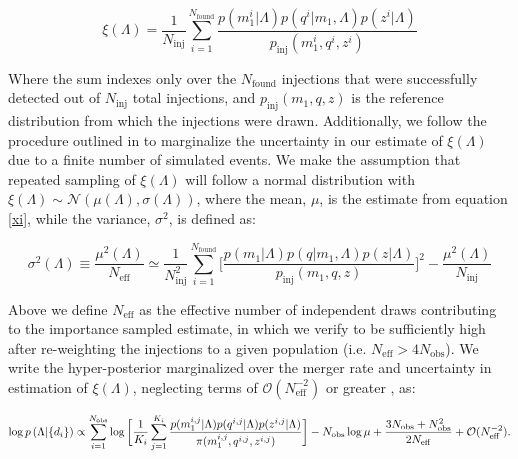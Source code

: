 \documentclass[twocolumn, linenumber]{aastex63}
\begin{document}
\begin{equation} \label{xi}
     \xi(\Lambda) = \frac{1}{N_\mathrm{inj}} \sum_{i=1}^{N_\mathrm{found}} \frac{p(m_1^i | \Lambda) p(q^i | m_1, \Lambda) p(z^i | \Lambda)}{p_\mathrm{inj}(m_1^i, q^i, z^i)}
\end{equation}

\noindent
Where the sum indexes only over the $N_\mathrm{found}$ injections that were successfully detected out of $N_\mathrm{inj}$ total injections, and $p_\mathrm{inj}(m_1, q, z)$ is the reference distribution from which the injections were drawn. Additionally, we follow the procedure outlined in \citet{Farr_2019} to marginalize the uncertainty in our estimate of $\xi(\Lambda)$ due to a finite number of simulated events. We make the assumption that repeated sampling of $\xi(\Lambda)$ will follow a normal distribution with $\xi(\Lambda) \sim \mathcal{N}(\mu(\Lambda), \sigma(\Lambda))$, where the mean, $\mu$, is the estimate from equation \ref{xi}, while the variance, $\sigma^2$, is defined as:

\begin{equation}
    \sigma^2(\Lambda) \equiv \frac{\mu^2(\Lambda)}{N_\mathrm{eff}} \simeq \frac{1}{N^2_\mathrm{inj}} \sum_{i=1}^{N_\mathrm{found}} \bigg[\frac{p(m_1 | \Lambda) p(q | m_1, \Lambda) p(z | \Lambda)}{p_\mathrm{inj}(m_1, q, z)}\bigg]^2 - \frac{\mu^2(\Lambda)}{N_\mathrm{inj}}
\end{equation}

\noindent
Above we define $N_\mathrm{eff}$ as the effective number of independent draws contributing to the importance sampled estimate, in which we verify to be sufficiently high after re-weighting the injections to a given population (i.e. $N_\mathrm{eff} > 4N_\mathrm{obs}$). We write the hyper-posterior marginalized over the merger rate and uncertainty in estimation of $\xi(\Lambda)$, neglecting terms of $\mathcal{O}(N_\mathrm{eff}^{-2})$ or greater \citep{Farr_2019}, as:

\begin{equation}\label{importance-posterior}
    \log p\left(\Lambda | \{d_i\}\right) \propto \sum_{i=1}^{N_\mathrm{obs}} \log \bigg[ \frac{1}{K_i} \sum_{j=1}^{K_i} \frac{p(m_1^{i,j}|\Lambda)p(q^{i,j}|\Lambda)p(z^{i,j}|\Lambda)}{\pi(m_1^{i,j}, q^{i,j}, z^{i,j})} \bigg] -  \\
    N_\mathrm{obs} \log \mu + \frac{3N_\mathrm{obs} + N_\mathrm{obs}^2}{2N_\mathrm{eff}} + \mathcal{O}(N_\mathrm{eff}^{-2}).
\end{equation}
\end{document}
